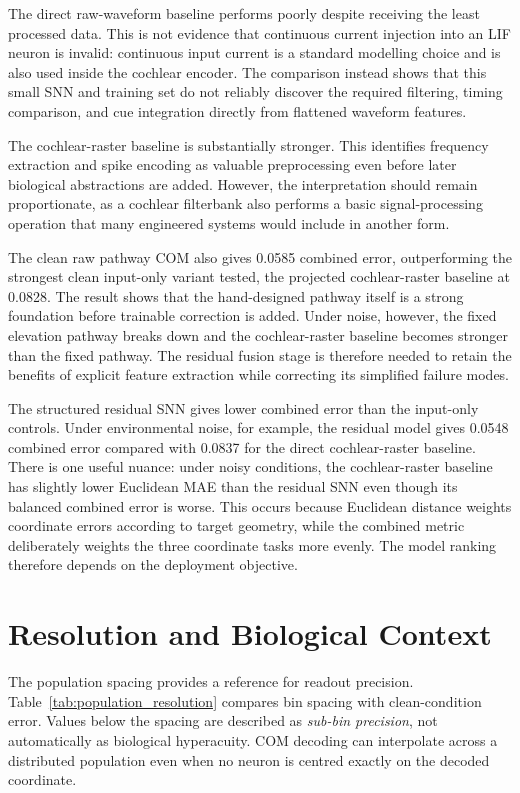 The direct raw-waveform baseline performs poorly despite receiving the least processed data. This is not evidence that continuous current injection into an LIF neuron is invalid: continuous input current is a standard modelling choice and is also used inside the cochlear encoder. The comparison instead shows that this small SNN and training set do not reliably discover the required filtering, timing comparison, and cue integration directly from flattened waveform features.

The cochlear-raster baseline is substantially stronger. This identifies frequency extraction and spike encoding as valuable preprocessing even before later biological abstractions are added. However, the interpretation should remain proportionate, as a cochlear filterbank also performs a basic signal-processing operation that many engineered systems would include in another form.

The clean raw pathway COM also gives 0.0585 combined error, outperforming the strongest clean input-only variant tested, the projected cochlear-raster baseline at 0.0828. The result shows that the hand-designed pathway itself is a strong foundation before trainable correction is added. Under noise, however, the fixed elevation pathway breaks down and the cochlear-raster baseline becomes stronger than the fixed pathway. The residual fusion stage is therefore needed to retain the benefits of explicit feature extraction while correcting its simplified failure modes.

The structured residual SNN gives lower combined error than the input-only controls. Under environmental noise, for example, the residual model gives 0.0548 combined error compared with 0.0837 for the direct cochlear-raster baseline. There is one useful nuance: under noisy conditions, the cochlear-raster baseline has slightly lower Euclidean MAE than the residual SNN even though its balanced combined error is worse. This occurs because Euclidean distance weights coordinate errors according to target geometry, while the combined metric deliberately weights the three coordinate tasks more evenly. The model ranking therefore depends on the deployment objective.

\section{Resolution and Biological Context}

The population spacing provides a reference for readout precision. Table~\ref{tab:population_resolution} compares bin spacing with clean-condition error. Values below the spacing are described as \emph{sub-bin precision}, not automatically as biological hyperacuity. COM decoding can interpolate across a distributed population even when no neuron is centred exactly on the decoded coordinate.

